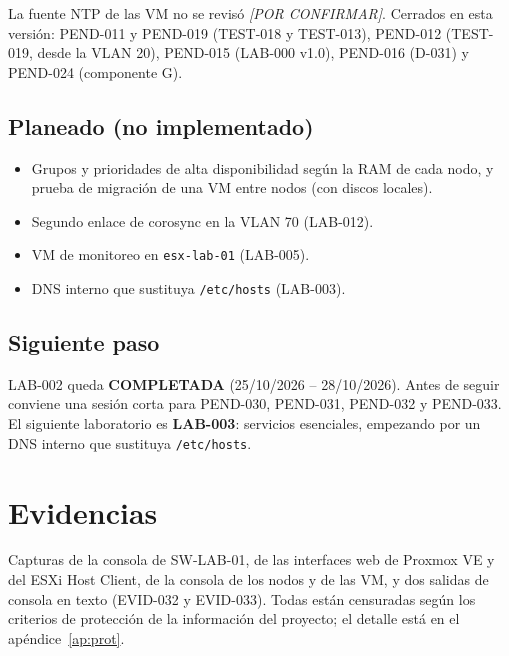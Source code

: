 \documentclass[11pt,a4paper]{article}
\newcommand{\pc}{\textcolor{muted}{\textit{[POR CONFIRMAR]}}}
\newcommand{\estado}[1]{%
  \ifstrequal{#1}{COMPLETADA}{\textcolor{okgreen}{\textbf{\footnotesize #1}}}{%
  \ifstrequal{#1}{OPERATIVO VALIDADO}{\textcolor{okgreen}{\textbf{\footnotesize #1}}}{%
  \ifstrequal{#1}{OK}{\textcolor{okgreen}{\textbf{\footnotesize #1}}}{%
  \ifstrequal{#1}{RESUELTO}{\textcolor{okgreen}{\textbf{\footnotesize #1}}}{%
  \ifstrequal{#1}{EN CURSO}{\textcolor{amber}{\textbf{\footnotesize #1}}}{%
  \ifstrequal{#1}{REPORTADO}{\textcolor{amber}{\textbf{\footnotesize #1}}}{%
  \ifstrequal{#1}{NO EJECUTADA}{\textcolor{muted}{\textbf{\footnotesize #1}}}{%
  \ifstrequal{#1}{PROPUESTO}{\textcolor{violet}{\textbf{\footnotesize #1}}}{%
  \ifstrequal{#1}{PENDIENTE}{\textcolor{alertred}{\textbf{\footnotesize #1}}}{%
  \ifstrequal{#1}{FALLIDA}{\textcolor{alertred}{\textbf{\footnotesize #1}}}{%
  \textbf{\footnotesize #1}}}}}}}}}}}}
\begin{document}
La fuente NTP de las VM no se revisó \pc{}. Cerrados en esta versión: PEND-011 y PEND-019 (TEST-018 y TEST-013), PEND-012 (TEST-019, desde la VLAN 20), PEND-015 (LAB-000 v1.0), PEND-016 (D-031) y PEND-024 (componente G).

\subsection{Planeado (no implementado)}
\begin{itemize}
  \item Grupos y prioridades de alta disponibilidad según la RAM de cada nodo, y prueba de migración de una VM entre nodos (con discos locales).
  \item Segundo enlace de corosync en la VLAN 70 (LAB-012).
  \item VM de monitoreo en \texttt{esx-lab-01} (LAB-005).
  \item DNS interno que sustituya \texttt{/etc/hosts} (LAB-003).
\end{itemize}

\subsection{Siguiente paso}
LAB-002 queda \estado{COMPLETADA} (25/10/2026 -- 28/10/2026). Antes de seguir conviene una sesión corta para PEND-030, PEND-031, PEND-032 y PEND-033. El siguiente laboratorio es \textbf{LAB-003}: servicios esenciales, empezando por un DNS interno que sustituya \texttt{/etc/hosts}.

\appendix
\renewcommand{\thesection}{\Alph{section}}
\titleformat{\section}{\Large\bfseries\color{navy}}{Apéndice \thesection.}{0.6em}{}

\section{Evidencias}\label{ap:evid}
Capturas de la consola de SW-LAB-01, de las interfaces web de Proxmox VE y del ESXi Host Client, de la consola de los nodos y de las VM, y dos salidas de consola en texto (EVID-032 y EVID-033). Todas están censuradas según los criterios de protección de la información del proyecto; el detalle está en el apéndice~\ref{ap:prot}.
\end{document}
